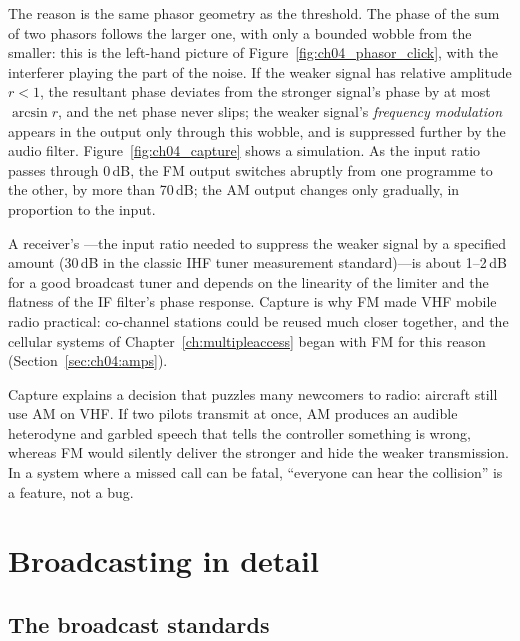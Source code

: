 The reason is the same phasor geometry as the threshold. The phase of the sum of two phasors follows the
larger one, with only a bounded wobble from the smaller: this is the left-hand picture of
Figure~\ref{fig:ch04_phasor_click}, with the interferer playing the part of the noise. If the weaker signal
has relative amplitude $r<1$, the resultant phase deviates from the stronger signal's phase by at most
$\arcsin r$, and the net phase never slips; the weaker signal's \emph{frequency modulation} appears in the
output only through this wobble, and is suppressed further by the audio filter.
Figure~\ref{fig:ch04_capture} shows a simulation. As the input ratio passes through 0\,dB, the FM output
switches abruptly from one programme to the other, by more than 70\,dB; the AM output changes only
gradually, in proportion to the input.

A receiver's ---the input ratio needed to suppress the weaker signal by a specified
amount (30\,dB in the classic IHF tuner measurement standard)---is about 1--2\,dB for a good broadcast tuner
and depends on the linearity of the limiter and the flatness of the IF filter's phase response. Capture is
why FM made VHF mobile radio practical: co-channel stations could be reused much closer together, and the
cellular systems of Chapter~\ref{ch:multipleaccess} began with FM for this reason
(Section~\ref{sec:ch04:amps}).

\begin{inpractice}
Capture explains a decision that puzzles many newcomers to radio: aircraft still use AM on VHF. If two
pilots transmit at once, AM produces an audible heterodyne and garbled speech that tells the controller
something is wrong, whereas FM would silently deliver the stronger and hide the weaker transmission. In a
system where a missed call can be fatal, ``everyone can hear the collision'' is a feature, not a bug.
\end{inpractice}

\section{Broadcasting in detail}
\label{sec:ch04:broadcast}

\subsection{The broadcast standards}

